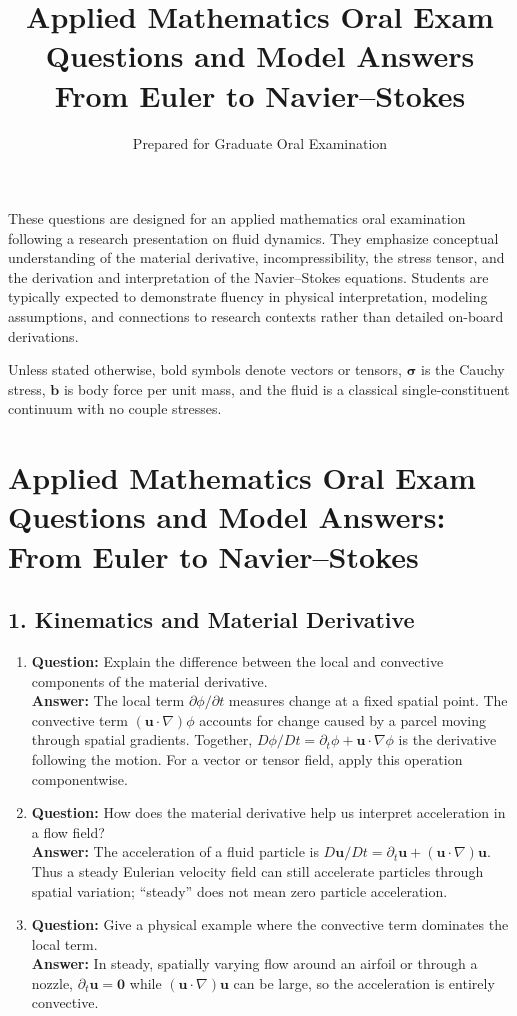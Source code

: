 \documentclass[12pt]{article}
\title{\vspace{-2em}\textbf{Applied Mathematics Oral Exam Questions and Model Answers}\\
\large From Euler to Navier--Stokes}
\author{Prepared for Graduate Oral Examination}
\date{}
\begin{document}
\maketitle
\thispagestyle{empty}

These questions are designed for an applied mathematics oral examination following a research presentation on fluid dynamics.  
They emphasize conceptual understanding of the material derivative, incompressibility, the stress tensor, and the derivation and interpretation of the Navier--Stokes equations.  
Students are typically expected to demonstrate fluency in physical interpretation, modeling assumptions, and connections to research contexts rather than detailed on-board derivations.

Unless stated otherwise, bold symbols denote vectors or tensors, $\boldsymbol{\sigma}$ is the Cauchy stress, $\mathbf{b}$ is body force per unit mass, and the fluid is a classical single-constituent continuum with no couple stresses.

\section*{Applied Mathematics Oral Exam Questions and Model Answers:\\
From Euler to Navier--Stokes}

\subsection*{1. Kinematics and Material Derivative}
\begin{enumerate}
\item \textbf{Question:} Explain the difference between the local and convective components of the material derivative.\\
\textbf{Answer:} The local term $\partial \phi/\partial t$ measures change at a fixed spatial point. The convective term $(\mathbf{u}\cdot\nabla)\phi$ accounts for change caused by a parcel moving through spatial gradients. Together,
$D\phi/Dt=\partial_t\phi+\mathbf{u}\cdot\nabla\phi$ is the derivative following the motion. For a vector or tensor field, apply this operation componentwise.

\item \textbf{Question:} How does the material derivative help us interpret acceleration in a flow field?\\
\textbf{Answer:} The acceleration of a fluid particle is $D\mathbf{u}/Dt=\partial_t\mathbf{u}+(\mathbf{u}\cdot\nabla)\mathbf{u}$. Thus a steady Eulerian velocity field can still accelerate particles through spatial variation; ``steady'' does not mean zero particle acceleration.

\item \textbf{Question:} Give a physical example where the convective term dominates the local term.\\
\textbf{Answer:} In steady, spatially varying flow around an airfoil or through a nozzle, $\partial_t\mathbf{u}=\mathbf{0}$ while $(\mathbf{u}\cdot\nabla)\mathbf{u}$ can be large, so the acceleration is entirely convective.
\end{enumerate}
\end{document}
